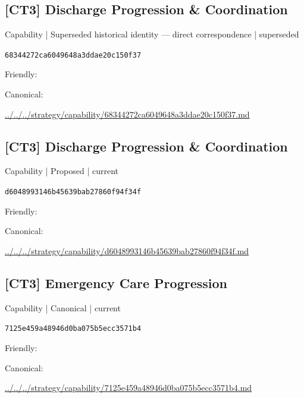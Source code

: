\documentclass[10pt,a4paper]{article}
\begin{document}
\subsection*{[CT3] Discharge Progression \& Coordination}
{\small Capability | Superseded historical identity — direct correspondence | superseded}\par
\texttt{68344272ca6049648a3ddae20c150f37}\par
Friendly: \par
Canonical: \par
{\footnotesize\url{../../../strategy/capability/68344272ca6049648a3ddae20c150f37.md}}\par
\subsection*{[CT3] Discharge Progression \& Coordination}
{\small Capability | Proposed | current}\par
\texttt{d6048993146b45639bab27860f94f34f}\par
Friendly: \par
Canonical: \par
{\footnotesize\url{../../../strategy/capability/d6048993146b45639bab27860f94f34f.md}}\par
\subsection*{[CT3] Emergency Care Progression}
{\small Capability | Canonical | current}\par
\texttt{7125e459a48946d0ba075b5ecc3571b4}\par
Friendly: \par
Canonical: \par
{\footnotesize\url{../../../strategy/capability/7125e459a48946d0ba075b5ecc3571b4.md}}\par
\end{document}
